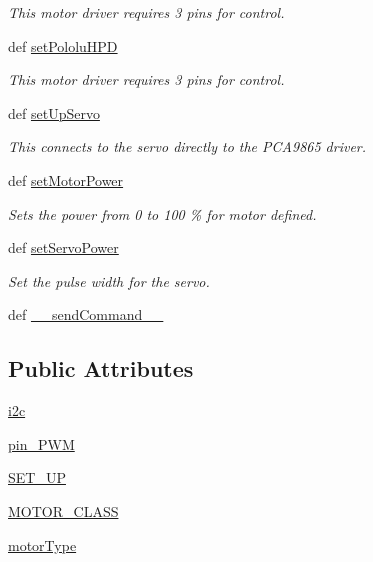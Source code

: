 \begin{DoxyCompactItemize}
\begin{DoxyCompactList}\small\item\em This motor driver requires 3 pins for control. \end{DoxyCompactList}\item 
def \hyperlink{classinterface_1_1MOTOR__CORE_1_1DC_a562d14585f151182842fe34106a1d88c}{set\+Pololu\+H\+P\+D}
\begin{DoxyCompactList}\small\item\em This motor driver requires 3 pins for control. \end{DoxyCompactList}\item 
def \hyperlink{classinterface_1_1MOTOR__CORE_1_1DC_a11b3993f834e3a032134faacc590ad6a}{set\+Up\+Servo}
\begin{DoxyCompactList}\small\item\em This connects to the servo directly to the P\+C\+A9865 driver. \end{DoxyCompactList}\item 
def \hyperlink{classinterface_1_1MOTOR__CORE_1_1DC_acd058e10f316149548b64f26a75f6dc5}{set\+Motor\+Power}
\begin{DoxyCompactList}\small\item\em Sets the power from 0 to 100 \% for motor defined. \end{DoxyCompactList}\item 
def \hyperlink{classinterface_1_1MOTOR__CORE_1_1DC_a9d0cb15bc32abd7e5ffef57a9d83c9b1}{set\+Servo\+Power}
\begin{DoxyCompactList}\small\item\em Set the pulse width for the servo. \end{DoxyCompactList}\item 
def \hyperlink{classinterface_1_1MOTOR__CORE_1_1DC_a143580f4f51c92080dd75f2b70b56d2d}{\+\_\+\+\_\+send\+Command\+\_\+\+\_\+}
\end{DoxyCompactItemize}
\subsection*{Public Attributes}
\begin{DoxyCompactItemize}
\item 
\hyperlink{classinterface_1_1MOTOR__CORE_1_1DC_ab56d4c557a40a80a28ae2ceaff61dd2a}{i2c}
\item 
\hyperlink{classinterface_1_1MOTOR__CORE_1_1DC_a36378d74aada41072e127414b1fa4f7c}{pin\+\_\+\+P\+W\+M}
\item 
\hyperlink{classinterface_1_1MOTOR__CORE_1_1DC_af998a45812eef8704631ad3232fe488c}{S\+E\+T\+\_\+\+U\+P}
\item 
\hyperlink{classinterface_1_1MOTOR__CORE_1_1DC_ae75ee5914116c8df53c0da589402c772}{M\+O\+T\+O\+R\+\_\+\+C\+L\+A\+S\+S}
\item 
\hyperlink{classinterface_1_1MOTOR__CORE_1_1DC_a1589cc7094bf9d1bfd96027912923182}{motor\+Type}
\end{DoxyCompactItemize}


